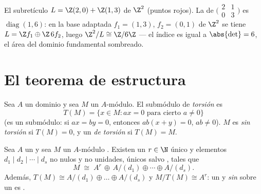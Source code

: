 \begin{omfigure}

{\small El subretículo $L = \Z(2,0) + \Z(1,3)$ de $\Z^2$ (puntos rojos).
La  de
$\bigl(\begin{smallmatrix} 2 &
1\\ 0 & 3\end{smallmatrix}\bigr)$ es $\operatorname{diag}(1, 6)$: en la
base adaptada $f_1 = (1,3)$, $f_2 = (0,1)$ de $\Z^2$ se tiene
$L = \Z f_1 \oplus \Z\,6f_2$, luego $\Z^2/L \cong \Z/6\Z$ --- el índice
es igual a $\abs{\det} = 6$, el área del dominio fundamental sombreado.}
\end{omfigure}

\section{El teorema de estructura}

\begin{definition}\label{def:b3:modules:torsion}
Sea $A$ un dominio y sea $M$ un $A$-módulo. El submódulo de
\emph{torsión} es
\[
T(M) = \{x \in M : ax = 0 \text{ para cierto } a \neq 0\}
\]
(es un submódulo: si $ax = by = 0$, entonces $ab(x + y) = 0$,
$ab \ne 0$). $M$ es \emph{sin torsión} si
$T(M) = 0$, y un \emph{ de
torsión} si $T(M) = M$.
\end{definition}

\begin{theorem}\label{thm:b3:modules:structure} Sea $A$ un
 y sea $M$ un $A$-módulo
. Existen un
$r \in \N$ único y elementos $d_1 \mid d_2 \mid
\cdots \mid d_s$ no nulos y no unidades, únicos salvo
, tales que
\[
M \;\cong\; A^r \,\oplus\, A/(d_1) \oplus \cdots \oplus A/(d_s).
\]
Además, $T(M) \cong A/(d_1)\oplus\dots\oplus A/(d_s)$ y $M/T(M)
\cong A^r$: un  y
\emph{sin } sobre un
 es
.
\end{theorem}

